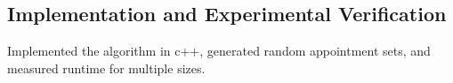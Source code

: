 \documentclass[conference]{IEEEtran}
\begin{document}
\subsection{Implementation and Experimental Verification}
Implemented the algorithm in c++, generated random appointment sets, and measured runtime for multiple sizes. 

\end{document}

